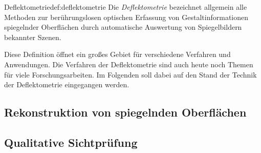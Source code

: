 \begin{Definition}{Deflektometrie}{def:deflektometrie}
	Die \textit{Deflektometrie} bezeichnet allgemein alle Methoden zur berührungslosen optischen Erfassung von Gestaltinformationen spiegelnder Oberflächen durch automatische Auswertung von Spiegelbildern bekannter Szenen. \cite{fraunhofer}
\end{Definition}

\noindent
Diese Definition öffnet ein großes Gebiet für verschiedene Verfahren und Anwendungen.
Die Verfahren der Deflektometrie sind auch heute noch Themen für viele Forschungsarbeiten.
Im Folgenden soll dabei auf den Stand der Technik der Deflektometrie eingegangen werden.

{
	\FloatBarrier
    \subsection{Rekonstruktion von spiegelnden Oberflächen}
    \label{sub:rekonstruktion}
    
}

{
	\FloatBarrier
    \subsection{Qualitative Sichtprüfung}
    \label{sub:qualitativeSichtpruefung}
    
}